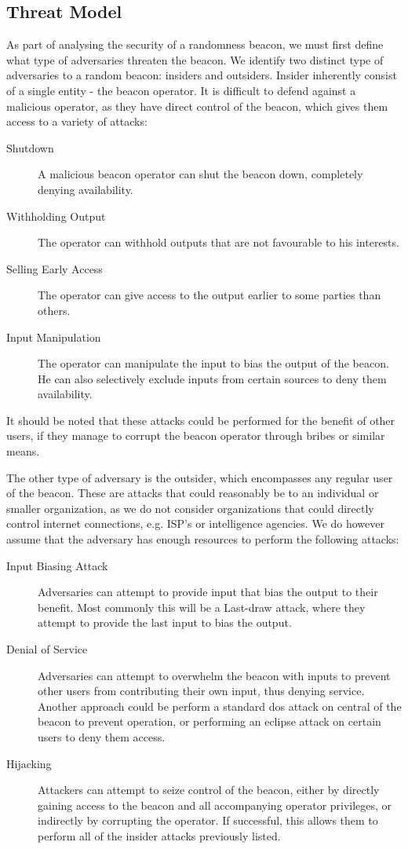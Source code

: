 \subsection{Threat Model}
As part of analysing the security of a randomness beacon, we must first define what type of adversaries threaten the beacon. We identify two distinct type of adversaries to a random beacon: insiders and outsiders. Insider inherently consist of a single entity - the beacon operator. It is difficult to defend against a malicious operator, as they have direct control of the beacon, which gives them access to a variety of attacks:

\begin{description}
    \item [Shutdown] A malicious beacon operator can shut the beacon down, completely denying availability. 
    \item [Withholding Output] The operator can withhold outputs that are not favourable to his interests. 
    \item [Selling Early Access] The operator can give access to the output earlier to some parties than others.
    \item [Input Manipulation] The operator can manipulate the input to bias the output of the beacon. He can also selectively exclude inputs from certain sources to deny them availability. 

\end{description} 

It should be noted that these attacks could be performed for the benefit of other users, if they manage to corrupt the beacon operator through bribes or similar means. 

The other type of adversary is the outsider, which encompasses any regular user of the beacon. These are attacks that could reasonably be to an individual or smaller organization, as we do not consider organizations that could directly control internet connections, e.g. ISP's or intelligence agencies. We do however assume that the adversary has enough resources to perform the following attacks: 

\begin{description}
    \item [Input Biasing Attack] Adversaries can attempt to provide input that bias the output to their benefit. Most commonly this will be a Last-draw attack, where they attempt to provide the last input to bias the output. 
    \item [Denial of Service] Adversaries can attempt to overwhelm the beacon with inputs to prevent other users from contributing their own input, thus denying service. Another approach could be perform a standard \gls{dos} attack on central of the beacon to prevent operation, or performing an eclipse attack on certain users to deny them access. 
    \item [Hijacking] Attackers can attempt to seize control of the beacon, either by directly gaining access to the beacon and all accompanying operator privileges, or indirectly by corrupting the operator. If successful, this allows them to perform all of the insider attacks previously listed.  
\end{description}



